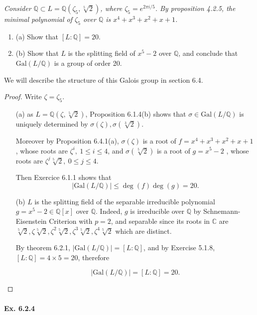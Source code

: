 \documentclass[11pt,a4paper]{article}
\newcommand{\be} {\begin{enumerate}}
\newcommand{\ee} {\end{enumerate}}
\newcommand{\Q}{\mathbb{Q}}
\newcommand{\C}{\mathbb{C}}
\newcommand{\Gal}{\mathrm{Gal}}
\begin{document}
{\it Consider $\Q \subset L = \Q(\zeta_5, \sqrt[5]{2})$, where $\zeta_5 = e^{2 \pi i /5}$. By proposition 4.2.5, the minimal polynomial of $\zeta_5$ over $\Q$ is $x^4+x^3+x^2+x+1$.
\be
\item[(a)] Show that $[L:\Q] = 20$.
\item[(b)] Show that $L$ is the splitting field of $x^5-2$ over $\Q$, and conclude that $\Gal(L/\Q)$ is a group of order 20.
\ee
We will describe the structure of this Galois group in section 6.4.
}

\begin{proof}
Write $\zeta = \zeta_5$.
\begin{enumerate}
\item[(a)]
as $L = \Q(\zeta,\sqrt[5]{2})$, Proposition 6.1.4(b) shows that $\sigma \in \mathrm{Gal}(L/\Q)$ is uniquely determined by $\sigma(\zeta),\sigma(\sqrt[3]{2})$.

Moreover by Proposition 6.4.1(a), $\sigma(\zeta)$ is a root of $f = x^4+x^3+x^2+x+1$, whose roots are $\zeta^i,\ 1\leq i \leq 4$, and $\sigma(\sqrt[5]{2})$ is a root of $g = x^5-2$ , whose roots are $\zeta^j \sqrt[5]{2},\ 0 \leq j \leq 4$.

Then Exercice 6.1.1 shows that $$\vert \mathrm{Gal}(L/\Q)\vert \leq \deg(f)\deg(g)=20.$$

\item[(b)]
$L$ is the splitting field of the separable irreducible polynomial $g = x^5-2\in \Q[x]$ over $\Q$. Indeed,  $g$ is  irreducible over $\Q$ by Schnemann-Eisenstein Criterion with $p=2$, and separable since its roots in $\C$ are $\sqrt[5]{2}, \zeta\sqrt[5]{2},\zeta^2 \sqrt[5]{2},\zeta^3 \sqrt[5]{2},\zeta^4\sqrt[5]{2}$ which are distinct.

By theorem 6.2.1, $\vert \mathrm{Gal}(L/\Q)\vert = [L:\Q]$, and by Exercise 5.1.8, $[L:\Q]=4 \times 5 = 20$, therefore

$$\vert \mathrm{Gal}(L/\Q)\vert = [L:\Q]=20.$$
\end{enumerate}
\end{proof}

\paragraph{Ex. 6.2.4}
\end{document}
